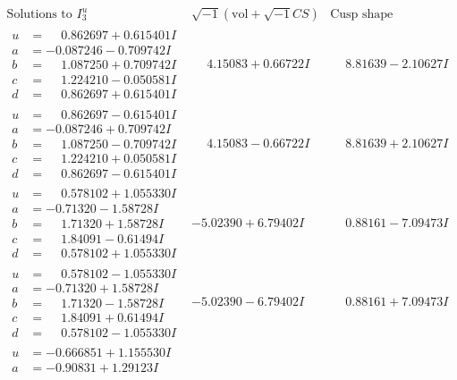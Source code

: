 \documentclass[1p]{elsarticle_modified}
\theoremstyle{definition}
\newcommand{\I}{\sqrt{-1}}
\begin{document}
$$\begin{array}{c|c|c}  
\text{Solutions to }I^u_{3}& \I (\text{vol} + \sqrt{-1}CS) & \text{Cusp shape}\\
 \hline 
\begin{aligned}
u &= \phantom{-}0.862697 + 0.615401 I \\
a &= -0.087246 - 0.709742 I \\
b &= \phantom{-}1.087250 + 0.709742 I \\
c &= \phantom{-}1.224210 - 0.050581 I \\
d &= \phantom{-}0.862697 + 0.615401 I\end{aligned}
 & \phantom{-}4.15083 + 0.66722 I & \phantom{-}8.81639 - 2.10627 I \\ \hline\begin{aligned}
u &= \phantom{-}0.862697 - 0.615401 I \\
a &= -0.087246 + 0.709742 I \\
b &= \phantom{-}1.087250 - 0.709742 I \\
c &= \phantom{-}1.224210 + 0.050581 I \\
d &= \phantom{-}0.862697 - 0.615401 I\end{aligned}
 & \phantom{-}4.15083 - 0.66722 I & \phantom{-}8.81639 + 2.10627 I \\ \hline\begin{aligned}
u &= \phantom{-}0.578102 + 1.055330 I \\
a &= -0.71320 - 1.58728 I \\
b &= \phantom{-}1.71320 + 1.58728 I \\
c &= \phantom{-}1.84091 - 0.61494 I \\
d &= \phantom{-}0.578102 + 1.055330 I\end{aligned}
 & -5.02390 + 6.79402 I & \phantom{-}0.88161 - 7.09473 I \\ \hline\begin{aligned}
u &= \phantom{-}0.578102 - 1.055330 I \\
a &= -0.71320 + 1.58728 I \\
b &= \phantom{-}1.71320 - 1.58728 I \\
c &= \phantom{-}1.84091 + 0.61494 I \\
d &= \phantom{-}0.578102 - 1.055330 I\end{aligned}
 & -5.02390 - 6.79402 I & \phantom{-}0.88161 + 7.09473 I \\ \hline\begin{aligned}
u &= -0.666851 + 1.155530 I \\
a &= -0.90831 + 1.29123 I \\

\end{aligned}
\end{array}$$
\end{document}

